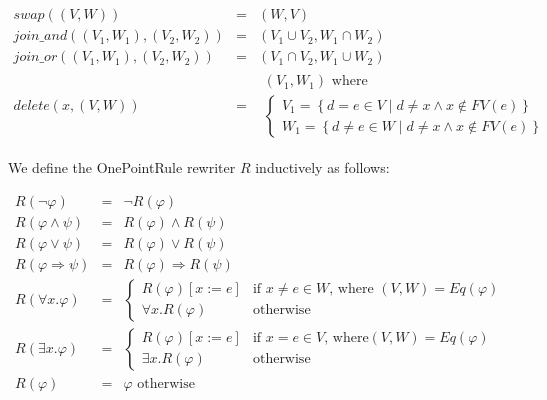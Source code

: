 \documentclass{article}
\begin{document}
\begin{equation*}
\begin{array}{lll}
swap\left( \left( V,W\right) \right) & = & \left( W,V\right) \\
join\_and\left( \left( V_{1},W_{1}\right) ,\left( V_{2},W_{2}\right) \right)
& = & \left( V_{1}\cup V_{2},W_{1}\cap W_{2}\right) \\
join\_or\left( \left( V_{1},W_{1}\right) ,\left( V_{2},W_{2}\right) \right)
& = & \left( V_{1}\cap V_{2},W_{1}\cup W_{2}\right) \\
delete\left( x,\left( V,W\right) \right) & = &
\begin{array}{l}
\left( V_{1},W_{1}\right) \text{ where} \\
\left\{
\begin{array}{c}
V_{1}=\left\{ d=e\in V\mid d\neq x\wedge x\notin FV(e)\right\} \\
W_{1}=\left\{ d\neq e\in W\mid d\neq x\wedge x\notin FV(e)\right\}%
\end{array}%
\right.%
\end{array}%
\end{array}%
\end{equation*}

We define the OnePointRule rewriter $R$ inductively as follows:

\begin{equation*}
\begin{array}{lll}
R\left( \lnot \varphi \right) & = & \lnot R\left( \varphi \right) \\
R\left( \varphi \wedge \psi \right) & = & R\left( \varphi \right) \wedge
R\left( \psi \right) \\
R\left( \varphi \vee \psi \right) & = & R\left( \varphi \right) \vee R\left(
\psi \right) \\
R\left( \varphi \Rightarrow \psi \right) & = & R\left( \varphi \right)
\Rightarrow R\left( \psi \right) \\
R\left( \forall x.\varphi \right) & = & \left\{
\begin{array}{cc}
R\left( \varphi \right) \left[ x:=e\right] & \text{if }x\neq e\in W\text{,
where }\left( V,W\right) =Eq\left( \varphi \right) \\
\forall x.R\left( \varphi \right) & \text{otherwise}%
\end{array}%
\right. \\
R\left( \exists x.\varphi \right) & = & \left\{
\begin{array}{cc}
R\left( \varphi \right) \left[ x:=e\right] & \text{if }x=e\in V\text{, where
}\left( V,W\right) =Eq\left( \varphi \right) \\
\exists x.R\left( \varphi \right) & \text{otherwise}%
\end{array}%
\right. \\
R\left( \varphi \right) & = & \varphi \text{ otherwise}%
\end{array}%
\end{equation*}
\end{document}
